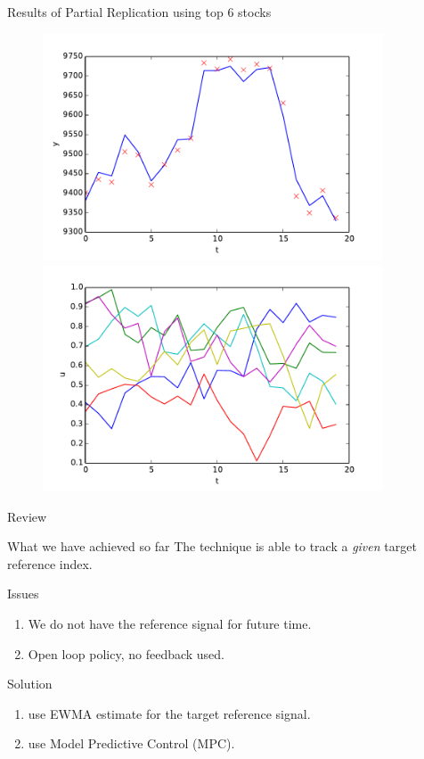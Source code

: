 \documentclass[handout]{beamer}
\begin{document}
\begin{frame}{Results of Partial Replication using top 6 stocks}
   \begin{figure}
    \centering
    \includegraphics[width = 0.9\textwidth, height=0.4\textheight]{figures/DAXPartial-y.pdf}\\
    \includegraphics[width = 0.9\textwidth, height=0.4\textheight]{figures/DAXPartial-u.pdf}
	\end{figure}
\end{frame}

\begin{frame}{Review}
\begin{block}{What we have achieved so far}
The technique is able to track a \emph{given} target reference index.
\end{block}

\begin{block}{Issues}
\begin{enumerate}
\item We do not have the reference signal for future time.
\item Open loop policy, no feedback used.
\end{enumerate}
\end{block}

\begin{block}{Solution}
\begin{enumerate}
\item use EWMA estimate for the target reference signal.
\item use Model Predictive Control (MPC).
\end{enumerate}
\end{block}
\end{frame}
\end{document}
